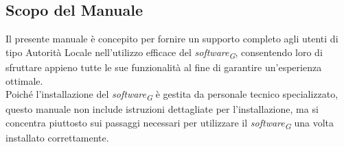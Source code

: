 \subsection{Scopo del Manuale}
Il presente manuale è concepito per fornire un supporto completo agli utenti di tipo Autorità Locale nell'utilizzo efficace del \textit{software}\textsubscript{\textit{G}}, consentendo loro di sfruttare appieno tutte le sue funzionalità al fine di garantire un'esperienza ottimale.\\
Poiché l'installazione del \textit{software}\textsubscript{\textit{G}} è gestita da personale tecnico specializzato, questo manuale non include istruzioni dettagliate per l'installazione, ma si concentra piuttosto sui passaggi necessari per utilizzare il \textit{software}\textsubscript{\textit{G}} una volta installato correttamente.
